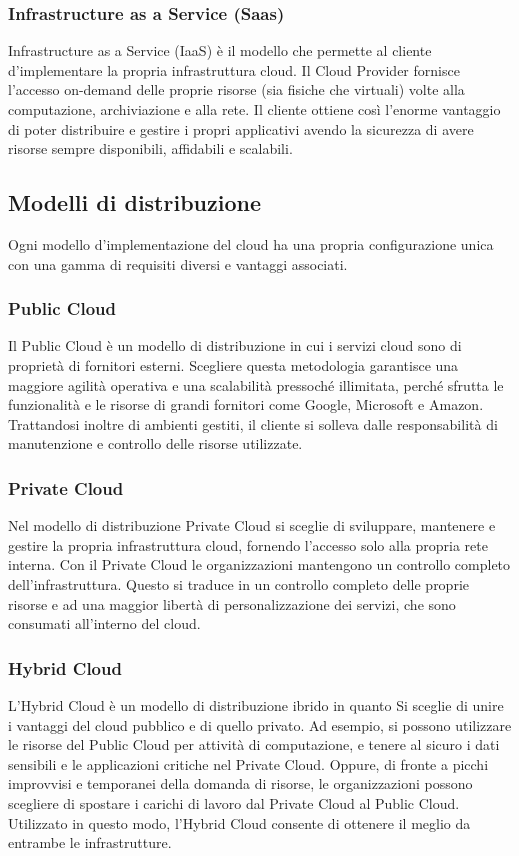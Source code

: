 \subsubsection{Infrastructure as a Service (Saas)}
Infrastructure as a Service (IaaS) è il modello che permette al cliente d'implementare la propria infrastruttura cloud. Il Cloud Provider fornisce l'accesso on-demand delle proprie risorse (sia fisiche che virtuali) volte alla computazione, archiviazione e alla rete.
Il cliente ottiene così l'enorme vantaggio di poter distribuire e gestire i propri applicativi avendo la sicurezza di avere risorse sempre disponibili, affidabili e scalabili.

\subsection{Modelli di distribuzione}
Ogni modello d'implementazione del cloud ha una propria configurazione unica con una gamma di requisiti diversi e vantaggi associati.

\subsubsection{Public Cloud}
Il Public Cloud è un modello di distribuzione in cui i servizi cloud sono di proprietà di fornitori esterni. Scegliere questa metodologia garantisce una maggiore agilità operativa e una scalabilità pressoché illimitata, perché sfrutta le funzionalità e le risorse di grandi fornitori come Google, Microsoft e Amazon.
Trattandosi inoltre di ambienti gestiti, il cliente si solleva dalle responsabilità di manutenzione e controllo delle risorse utilizzate.

\subsubsection{Private Cloud}
Nel modello di distribuzione Private Cloud si sceglie di sviluppare, mantenere e gestire la propria infrastruttura cloud, fornendo l'accesso solo alla propria rete interna. Con il Private Cloud le organizzazioni mantengono un controllo completo dell'infrastruttura. Questo si traduce in un controllo completo delle proprie risorse e ad una maggior libertà di personalizzazione dei servizi, che sono consumati all'interno del cloud.

\subsubsection{Hybrid Cloud}
L’Hybrid Cloud è un modello di distribuzione ibrido in quanto 
Si sceglie di unire i vantaggi del cloud pubblico e di quello privato.
Ad esempio, si possono utilizzare le risorse del Public Cloud per attività di computazione, e tenere al sicuro i dati sensibili e le applicazioni critiche nel Private Cloud. Oppure, di fronte a picchi improvvisi e temporanei della domanda di risorse, le organizzazioni possono scegliere di spostare i carichi di lavoro dal Private Cloud al Public Cloud.
Utilizzato in questo modo, l’Hybrid Cloud consente di ottenere il meglio da entrambe le infrastrutture.